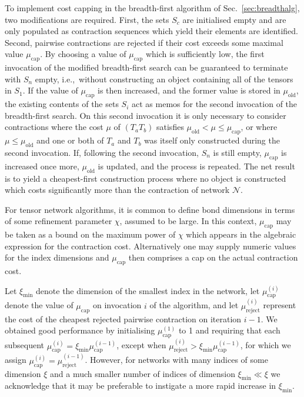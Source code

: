 \documentclass[aps,pre,reprint,superscriptaddress,amsfonts,amsmath,showpacs,nofootinbib,floatfix]{revtex4-1}
\newcommand{\mrm}[1]{\mathrm{#1}}
\newcommand{\mc}[1]{\mathcal{#1}}
\newcommand{\sref}[1]{Sec.~\ref{#1}}
\begin{document}
To implement cost capping in the breadth-first algorithm of \sref{sec:breadthalg}, two modifications are required. First, the sets $S_c$ are initialised empty and are only populated as contraction sequences which yield their elements are identified. Second, pairwise contractions are rejected if their cost exceeds some maximal value $\mu_\mrm{cap}$. By choosing a value of $\mu_\mrm{cap}$ which is sufficiently low, the first invocation of the modified breadth-first search can be guaranteed to terminate with $S_n$ empty, i.e.,~without constructing an object containing all of the tensors in $S_1$. If the value of $\mu_\mrm{cap}$ is then increased, and the former value is stored in $\mu_\mrm{old}$, the existing contents of the sets $S_i$ act as memos for the second invocation of the breadth-first search. On this second invocation it is only necessary to consider contractions where the cost $\mu$ of $(T_aT_b)$ satisfies $\mu_\mrm{old}<\mu\leq\mu_\mrm{cap}$, or where $\mu\leq\mu_\mrm{old}$ and one or both of $T_a$ and $T_b$ was itself only constructed during the second invocation. If, following the second invocation, $S_n$ is still empty, $\mu_\mrm{cap}$ is increased once more, $\mu_\mrm{old}$ is updated, and the process is repeated. The net result is to yield a cheapest-first construction process where no object is constructed which costs significantly more than the contraction of network $\mc{N}$.

For tensor network algorithms, it is common to define bond dimensions in terms of some refinement parameter $\chi$, assumed to be large. In this context, $\mu_\mrm{cap}$ may be taken as a bound on the maximum power of $\chi$ which appears in the algebraic expression for the contraction cost. Alternatively one may supply numeric values for the index dimensions and $\mu_\mrm{cap}$ then comprises a cap on the actual contraction cost.

Let $\xi_\mrm{min}$ denote the dimension of the smallest index in the network, let $\mu_\mrm{cap}^{(i)}$ denote the value of $\mu_\mrm{cap}$ on invocation $i$ of the algorithm, and let $\mu_\mrm{reject}^{(i)}$ represent the cost of the cheapest rejected pairwise contraction on iteration $i-1$.
We obtained good performance by initialising $\mu^{(1)}_\mrm{cap}$ to 1 and requiring that each subsequent $\mu^{(i)}_\mrm{cap}=\xi_\mrm{min}\mu_\mrm{cap}^{(i-1)}$, except when $\mu_\mrm{reject}^{(i)}>\xi_\mrm{min}\mu_\mrm{cap}^{(i-1)}$, for which we assign $\mu_\mrm{cap}^{(i)} = \mu_\mrm{reject}^{(i-1)}$. However, for networks with many indices of some dimension $\xi$ and a much smaller number of indices of dimension $\xi_\mrm{min}\ll\xi$ we acknowledge that it may be preferable to instigate a more rapid increase in $\xi_\mrm{min}$.
\end{document}

